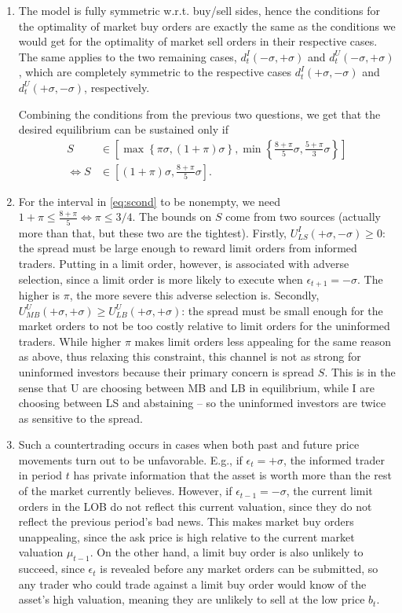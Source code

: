 \documentclass[a4paper]{article}
\begin{document}
\begin{enumerate}
	\item The model is fully symmetric w.r.t. buy/sell sides, hence the conditions for the optimality of market buy orders are exactly the same as the conditions we would get for the optimality of market sell orders in their respective cases. The same applies to the two remaining cases, $d^I_t(-\sigma, +\sigma)$ and $d^U_t(-\sigma, +\sigma)$, which are completely symmetric to the respective cases $d^I_t(+\sigma, -\sigma)$ and $d^U_t(+\sigma, -\sigma)$, respectively.
	
	Combining the conditions from the previous two questions, we get that the desired equilibrium can be sustained only if
	\begin{align}
		S &\in \left[ \max \left\{\pi \sigma, (1+\pi)\sigma \right\}, \min \left\{ \frac{8+\pi}{5}\sigma, \frac{5+\pi}{3}\sigma \right\} \right]
		\nonumber
		\\
		\iff S &\in \left[ (1+\pi)\sigma, \frac{8+\pi}{5}\sigma \right].
		\label{eq:scond}
	\end{align}
	
	\item For the interval in \eqref{eq:scond} to be nonempty, we need $1+\pi \leq \frac{8+\pi}{5} \iff \pi \leq 3/4$. The bounds on $S$ come from two sources (actually more than that, but these two are the tightest). Firstly, $U^I_{LS}(+\sigma, -\sigma) \geq 0$: the spread must be large enough to reward limit orders from informed traders. Putting in a limit order, however, is associated with adverse selection, since a limit order is more likely to execute when $\epsilon_{t+1}=-\sigma$. The higher is $\pi$, the more severe this adverse selection is. Secondly, $U^U_{MB}(+\sigma,+\sigma) \geq U^U_{LB}(+\sigma,+\sigma)$: the spread must be small enough for the market orders to not be too costly relative to limit orders for the uninformed traders. While higher $\pi$ makes limit orders less appealing for the same reason as above, thus relaxing this constraint, this channel is not as strong for uninformed investors because their primary concern is spread $S$. This is in the sense that U are choosing between MB and LB in equilibrium, while I are choosing between LS and abstaining -- so the uninformed investors are twice as sensitive to the spread.
	
	\item Such a countertrading occurs in cases when both past and future price movements turn out to be unfavorable. E.g., if $\epsilon_t = +\sigma$, the informed trader in period $t$ has private information that the asset is worth more than the rest of the market currently believes. However, if $\epsilon_{t-1} = -\sigma$, the current limit orders in the LOB do not reflect this current valuation, since they do not reflect the previous period's bad news. This makes market buy orders unappealing, since the ask price is high relative to the current market valuation $\mu_{t-1}$. On the other hand, a limit buy order is also unlikely to succeed, since $\epsilon_t$ is revealed before any market orders can be submitted, so any trader who could trade against a limit buy order would know of the asset's high valuation, meaning they are unlikely to sell at the low price $b_t$.
	

\end{enumerate}
\end{document}
